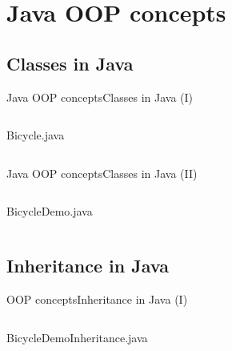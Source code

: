 \documentclass[10pt,compress]{beamer} %
\begin{document}
\section{Java OOP concepts}
\subsection{Classes in Java}
\begin{frame}{Java OOP concepts}{Classes in Java (I)}
	\vspace{-0.4cm}
    \begin{columns}
			\begin{block}{Bicycle.java}
			\vspace{-0.3cm}
				
			\end{block}
	\end{columns}
\end{frame}

\begin{frame}{Java OOP concepts}{Classes in Java (II)}
	\vspace{-0.4cm}
    \begin{columns}
			\begin{block}{BicycleDemo.java}
			\vspace{-0.3cm}
				
			\end{block}
	\end{columns}
\end{frame}

\subsection[Inheritance]{Inheritance in Java}

\begin{frame}{OOP concepts}{Inheritance in Java (I)}
	\vspace{-0.3cm}
    \begin{columns}
			\begin{block}{BicycleDemoInheritance.java}
			\vspace{-0.2cm}
				
			\end{block}
	\end{columns}
\end{frame}
\end{document}

